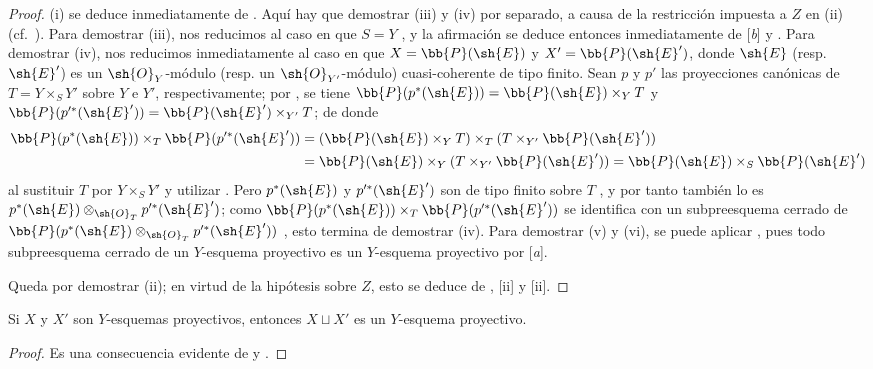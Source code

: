 \documentclass[oneside,10pt]{amsart}
\let\EGAOriginalLabel\label
\renewcommand{\label}[1]{\phantomsection\EGAOriginalLabel{#1}}
\begin{document}
\begin{proof}
(i) se deduce inmediatamente de .
Aquí hay que demostrar (iii) y (iv) por separado, a causa de la restricción impuesta a $Z$ en (ii) (cf.~).
Para demostrar (iii), nos reducimos al caso en que $S=Y$ , y la afirmación se deduce entonces inmediatamente de [\emph{b}] y .
Para demostrar (iv), nos reducimos inmediatamente al caso en que $X=\bb{P}(\sh{E})$ y $X'=\bb{P}(\sh{E}')$, donde $\sh{E}$ (resp. $\sh{E}'$) es un $\sh{O}_Y$-módulo (resp. un $\sh{O}_{Y'}$-módulo) cuasi-coherente de tipo finito.
Sean $p$ y $p'$ las proyecciones canónicas de $T=Y\times_S Y'$ sobre $Y$ e $Y'$, respectivamente; por , se tiene $\bb{P}(p^*(\sh{E}))=\bb{P}(\sh{E})\times_Y T$ y $\bb{P}(p^{\prime *}(\sh{E}'))=\bb{P}(\sh{E}')\times_{Y'}T$; de donde
\begin{align*}
  \bb{P}(p^*(\sh{E}))\times_T\bb{P}(p^{\prime *}(\sh{E}'))&=(\bb{P}(\sh{E})\times_Y T)\times_T(T\times_{Y'}\bb{P}(\sh{E}'))\\
                                               &=\bb{P}(\sh{E})\times_Y(T\times_{Y'}\bb{P}(\sh{E}'))=\bb{P}(\sh{E})\times_S\bb{P}(\sh{E}')
\end{align*}
al sustituir $T$ por $Y\times_S Y'$ y utilizar .
Pero $p^*(\sh{E})$ y $p^{\prime *}(\sh{E}')$ son de tipo finito sobre $T$ , y por tanto también lo es $p^*(\sh{E})\otimes_{\sh{O}_T}p^{\prime *}(\sh{E}')$;
como $\bb{P}(p^*(\sh{E}))\times_T\bb{P}(p^{\prime *}(\sh{E}'))$ se identifica con un subpreesquema cerrado de $\bb{P}(p^*(\sh{E})\otimes_{\sh{O}_T}p^{\prime *}(\sh{E}'))$ , esto termina de demostrar (iv).
Para demostrar (v) y (vi), se puede aplicar , pues todo subpreesquema cerrado de un $Y$-esquema proyectivo es un $Y$-esquema proyectivo por [\emph{a}].

Queda por demostrar (ii); en virtud de la hipótesis sobre $Z$, esto se deduce de , [ii] y [ii].
\end{proof}

\begin{proposition}[5.5.6]
\label{II.5.5.6}
Si $X$ y $X'$ son $Y$-esquemas proyectivos, entonces $X\sqcup X'$ es un $Y$-esquema proyectivo.
\end{proposition}

\begin{proof}
Es una consecuencia evidente de  y .
\end{proof}
\end{document}
